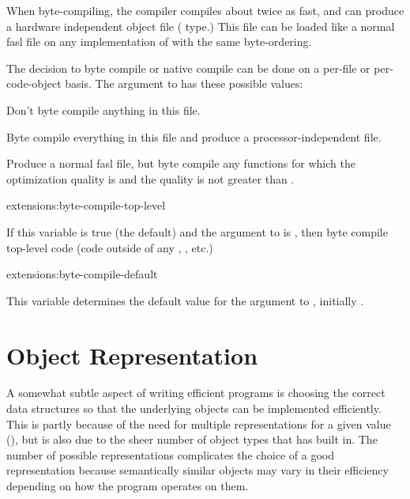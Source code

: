 When byte-compiling, the compiler compiles about twice as fast, and
can produce a hardware independent object file ( type.)
This file can be loaded like a normal fasl file on any implementation
of \cmucl{} with the same byte-ordering.

The decision to byte compile or native compile can be done on a
per-file or per-code-object basis.  The  argument to
 has these possible values:

\begin{Lentry}
\item[\false{}] Don't byte compile anything in this file.
  
\item[\true{}] Byte compile everything in this file and produce a
  processor-independent  file.
  
\item[\kwd{maybe}] Produce a normal fasl file, but byte compile any
  functions for which the  optimization quality is
   and the  quality is not greater than .
\end{Lentry}

\begin{defvar}{extensions:}{byte-compile-top-level}
  
  If this variable is true (the default) and the 
  argument to  is , then byte compile
  top-level code (code outside of any , ,
  etc.)
\end{defvar}

\begin{defvar}{extensions:}{byte-compile-default}
  
  This variable determines the default value for the
   argument to , initially
  .
\end{defvar}


\section{Object Representation}
\label{object-representation}

A somewhat subtle aspect of writing efficient \clisp{} programs is
choosing the correct data structures so that the underlying objects
can be implemented efficiently.  This is partly because of the need
for multiple representations for a given value
(), but is also due to the sheer number of
object types that \clisp{} has built in.  The number of possible
representations complicates the choice of a good representation
because semantically similar objects may vary in their efficiency
depending on how the program operates on them.


